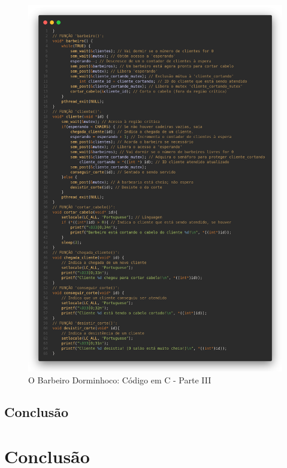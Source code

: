 \documentclass[
	12pt,				%
	openright,			%
	oneside,			%
	a4paper,			%
	chapter=TITLE,		%
	english,			%
	french,				%
	spanish,			%
	brazil				%
	]{abntex2}
\theoremstyle{definition}
\begin{document}
\begin{figure}[h]
    \centering
    \includegraphics[width=1.0\textwidth]{imagens/barbeiro_3.png}
    \caption{O Barbeiro Dorminhoco: Código em C - Parte III}
    \label{fig:barbeiro_3}
\end{figure}

\section{Conclusão}

\chapter{Conclusão}

\postextual



\cite{tanenbaum2010sistemas}
\end{document}
